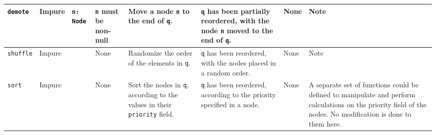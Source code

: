 \documentclass[10pt,letterpaper,final]{report}
\begin{document}
{\begin{center}
\begin{landscape}
\begin{xltabular}{\linewidth}{|l|l|X|X|X|X|X|X|}
          \verb|demote|    & Impure & \verb|n: Node|                    & \verb|n| must be non-null                                     & Move a node \verb|n| to the end of \verb|q|.                                                                                                                                                                                                                                                                                  & \verb|q| has been partially reordered, with the node \verb|n| moved to the end of \verb|q|.                                                                  & None     & Note                                                                                                                                                            \\ \hline
          \verb|shuffle|   & Impure &                                   & None                                                          & Randomize the order of the elements in \verb|q|.                                                                                                                                                                                                                                                                              & \verb|q| has been reordered, with the nodes placed in a random order.                                                                                        & None     & Note                                                                                                                                                            \\ \hline
          \verb|sort|      & Impure &                                   & None                                                          & Sort the nodes in \verb|q|, according to the values in their \verb|priority| field.                                                                                                                                                                                                                                           & \verb|q| has been reordered, according to the priority specified in a node.                                                                                  & None     & A separate set of functions could be defined to manipulate and perform calculations on the priority field of the nodes. No modification is done to them here.   \\ \hline
        \end{xltabular}
      \end{landscape}
    \end{center}
  }
\end{document}
